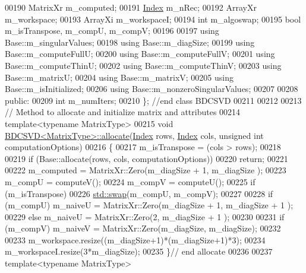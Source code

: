 \begin{DoxyCode}
00190   MatrixXr m\_computed;
00191   \hyperlink{namespace_eigen_a62e77e0933482dafde8fe197d9a2cfde}{Index} m\_nRec;
00192   ArrayXr m\_workspace;
00193   ArrayXi m\_workspaceI;
00194   \textcolor{keywordtype}{int} m\_algoswap;
00195   \textcolor{keywordtype}{bool} m\_isTranspose, m\_compU, m\_compV;
00196   
00197   \textcolor{keyword}{using} Base::m\_singularValues;
00198   \textcolor{keyword}{using} Base::m\_diagSize;
00199   \textcolor{keyword}{using} Base::m\_computeFullU;
00200   \textcolor{keyword}{using} Base::m\_computeFullV;
00201   \textcolor{keyword}{using} Base::m\_computeThinU;
00202   \textcolor{keyword}{using} Base::m\_computeThinV;
00203   \textcolor{keyword}{using} Base::m\_matrixU;
00204   \textcolor{keyword}{using} Base::m\_matrixV;
00205   \textcolor{keyword}{using} Base::m\_isInitialized;
00206   \textcolor{keyword}{using} Base::m\_nonzeroSingularValues;
00207 
00208 \textcolor{keyword}{public}:  
00209   \textcolor{keywordtype}{int} m\_numIters;
00210 \}; \textcolor{comment}{//end class BDCSVD}
00211 
00212 
00213 \textcolor{comment}{// Method to allocate and initialize matrix and attributes}
00214 \textcolor{keyword}{template}<\textcolor{keyword}{typename} MatrixType>
00215 \textcolor{keywordtype}{void} \hyperlink{group___s_v_d___module_class_eigen_1_1_b_d_c_s_v_d}{BDCSVD<MatrixType>::allocate}(\hyperlink{namespace_eigen_a62e77e0933482dafde8fe197d9a2cfde}{Index} rows, 
      \hyperlink{namespace_eigen_a62e77e0933482dafde8fe197d9a2cfde}{Index} cols, \textcolor{keywordtype}{unsigned} \textcolor{keywordtype}{int} computationOptions)
00216 \{
00217   m\_isTranspose = (cols > rows);
00218 
00219   \textcolor{keywordflow}{if} (Base::allocate(rows, cols, computationOptions))
00220     \textcolor{keywordflow}{return};
00221   
00222   m\_computed = MatrixXr::Zero(m\_diagSize + 1, m\_diagSize );
00223   m\_compU = computeV();
00224   m\_compV = computeU();
00225   \textcolor{keywordflow}{if} (m\_isTranspose)
00226     \hyperlink{endian_8c_a3ca5ecd34b04d6a243c054ac3a57f68d}{std::swap}(m\_compU, m\_compV);
00227   
00228   \textcolor{keywordflow}{if} (m\_compU) m\_naiveU = MatrixXr::Zero(m\_diagSize + 1, m\_diagSize + 1 );
00229   \textcolor{keywordflow}{else}         m\_naiveU = MatrixXr::Zero(2, m\_diagSize + 1 );
00230   
00231   \textcolor{keywordflow}{if} (m\_compV) m\_naiveV = MatrixXr::Zero(m\_diagSize, m\_diagSize);
00232   
00233   m\_workspace.resize((m\_diagSize+1)*(m\_diagSize+1)*3);
00234   m\_workspaceI.resize(3*m\_diagSize);
00235 \}\textcolor{comment}{// end allocate}
00236 
00237 \textcolor{keyword}{template}<\textcolor{keyword}{typename} MatrixType>

\end{DoxyCode}
